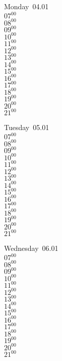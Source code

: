 \documentclass[11pt,a4paper]{book}\usepackage[]{graphicx}\usepackage[]{color}
\begin{document}
\begin{headerbox}
\end{headerbox}
\begin{weekdaybox}
  Monday~04.01\\
  { 
  \vfill
  $07^{00}$\\
$08^{00}$\\
$09^{00}$\\
$10^{00}$\\
$11^{00}$\\
$12^{00}$\\
$13^{00}$\\
$14^{00}$\\
$15^{00}$\\
$16^{00}$\\
$17^{00}$\\
$18^{00}$\\
$19^{00}$\\
$20^{00}$\\
$21^{00}$\\
  }
\end{weekdaybox}
\begin{weekdaybox}
  Tuesday~05.01\\
  { 
  \vfill
  $07^{00}$\\
$08^{00}$\\
$09^{00}$\\
$10^{00}$\\
$11^{00}$\\
$12^{00}$\\
$13^{00}$\\
$14^{00}$\\
$15^{00}$\\
$16^{00}$\\
$17^{00}$\\
$18^{00}$\\
$19^{00}$\\
$20^{00}$\\
$21^{00}$\\
  }
\end{weekdaybox}
\begin{weekdaybox}
  Wednesday~06.01\\
  { 
  \vfill
  $07^{00}$\\
$08^{00}$\\
$09^{00}$\\
$10^{00}$\\
$11^{00}$\\
$12^{00}$\\
$13^{00}$\\
$14^{00}$\\
$15^{00}$\\
$16^{00}$\\
$17^{00}$\\
$18^{00}$\\
$19^{00}$\\
$20^{00}$\\
$21^{00}$\\
  }
\end{weekdaybox}
\end{document}
